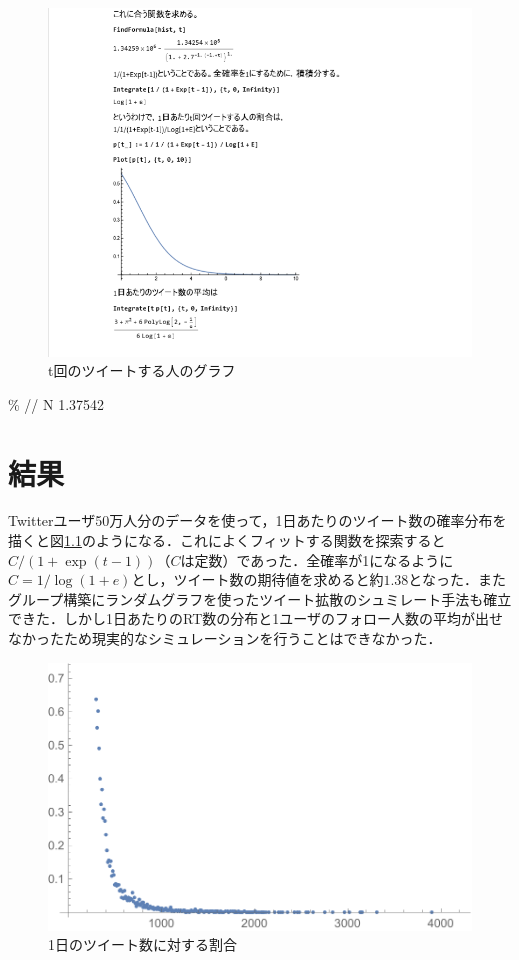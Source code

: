 \newpage

\begin{figure}[h]
\centering
\includegraphics[width=13cm]{hisu2.png}
\caption{t回のツイートする人のグラフ}\label{グラフ}
\end{figure}

\% // N
1.37542

\newpage


\chapter{結果}
Twitterユーザ50万人分のデータを使って，1日あたりのツイート数の確率分布を描くと図\ref{ツイートの分布}のようになる．これによくフィットする関数を探索すると$C/(1+\exp(t-1))$（$C$は定数）であった．全確率が1になるように$C=1/\log(1+e)$とし，ツイート数の期待値を求めると約$1.38$となった．またグループ構築にランダムグラフを使ったツイート拡散のシュミレート手法も確立できた．しかし1日あたりのRT数の分布と1ユーザのフォロー人数の平均が出せなかったため現実的なシミュレーションを行うことはできなかった．

\begin{figure}[htb]
\centering
\includegraphics[width=13cm]{tweets.pdf}
\caption{1日のツイート数に対する割合}\label{ツイートの分布}
\end{figure}

